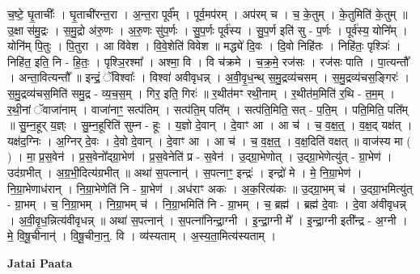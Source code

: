 \documentclass[17pt]{extarticle}
\begin{document}
च॒ष्टे॒ घृ॒ताचीः᳚ । घृ॒ताची॑रन्त॒रा । अ॒न्त॒रा पूर्व᳚म् । पूर्व॒मप॑रम् । अप॑रम् च । च॒ के॒तुम् । के॒तुमिति॑ के॒तुम् ॥ उ॒क्षा स॑मु॒द्रः । स॒मु॒द्रो अ॑रु॒णः । अ॒रु॒णः सु॑प॒र्णः । सु॒प॒र्णः पूर्व॑स्य । सु॒प॒र्ण इति॑ सु - प॒र्णः । पूर्व॑स्य॒ योनि᳚म् । योनि॑म् पि॒तुः । पि॒तुरा । आ वि॑वेश । वि॒वे॒शेति॑ विवेश ॥ मद्ध्ये॑ दि॒वः । दि॒वो निहि॑तः । निहि॑तः॒ पृश्ञिः॑ । निहि॑त॒ इति॒ नि - हि॒तः॒ । पृश्ञि॒रश्मा᳚ । अश्मा॒ वि । वि च॑क्रमे । च॒क्र॒मे॒ रज॑सः । रज॑सः पाति । पा॒त्यन्तौ᳚ । अन्ता॒वित्यन्तौ᳚ ॥ इन्द्रं॒ ॅविश्वाः᳚ । विश्वा॑ अवीवृधन्न् । अ॒वी॒वृ॒ध॒न्थ् स॒मु॒द्रव्य॑चसम् । स॒मु॒द्रव्य॑चस॒ङ्गिरः॑ । स॒मु॒द्रव्य॑चस॒मिति॑ समु॒द्र - व्य॒च॒स॒म् । गिर॒ इति॒ गिरः॑ ॥ र॒थीत॑मꣳ रथी॒नाम् । र॒थीत॑म॒मिति॑ र॒थि - त॒म॒म् । र॒थी॒नां ॅवाजा॑नाम् । वाजा॑नाꣳ॒॒ सत्प॑तिम् । सत्प॑ति॒म् पति᳚म् । सत्प॑ति॒मिति॒ सत् - प॒ति॒म् । पति॒मिति॒ पति᳚म् ॥ सु॒म्न॒हूर् य॒ज्ञ्ः । सु॒म्न॒हूरिति॑ सुम्न - हूः । य॒ज्ञो दे॒वान् । दे॒वाꣳ आ । आ च॑ । च॒ व॒क्ष॒त्॒ । व॒क्ष॒द् यक्ष॑त् । यक्ष॑द॒ग्निः । अ॒ग्निर् दे॒वः । दे॒वो दे॒वान् । दे॒वाꣳ आ । आ च॑ । च॒ व॒क्ष॒त्॒ । व॒क्ष॒दिति॑ वक्षत् ॥ वाज॑स्य मा ( ) । मा॒ प्र॒स॒वेन॑ । प्र॒स॒वेनो᳚द्ग्रा॒भेण॑ । प्र॒स॒वेनेति॑ प्र - स॒वेन॑ । उ॒द्ग्रा॒भेणोत् । उ॒द्ग्रा॒भेणेत्यु॑त् - ग्रा॒भेण॑ । उद॑ग्रभीत् । अ॒ग्र॒भी॒दित्य॑ग्रभीत् ॥ अथा॑ स॒पत्नान्॑ । स॒पत्नाꣳ॒॒ इन्द्रः॑ । इन्द्रो॑ मे । मे॒ नि॒ग्रा॒भेण॑ । नि॒ग्रा॒भेणाध॑रान् । नि॒ग्रा॒भेणेति॑ नि - ग्रा॒भेण॑ । अध॑राꣳ अकः । अ॒क॒रित्य॑कः ॥ उ॒द्ग्रा॒भम् च॑ । उ॒द्ग्रा॒भमित्यु॑त् - ग्रा॒भम् । च॒ नि॒ग्रा॒भम् । नि॒ग्रा॒भम् च॑ । नि॒ग्रा॒भमिति॑ नि - ग्रा॒भम् । च॒ ब्रह्म॑ । ब्रह्म॑ दे॒वाः । दे॒वा अ॑वीवृधन्न् । अ॒वी॒वृ॒ध॒न्नित्य॑वीवृधन्न् ॥ अथा॑ स॒पत्नान्॑ । स॒पत्ना॑निन्द्रा॒ग्नी । इ॒न्द्रा॒ग्नी मे᳚ । इ॒न्द्रा॒ग्नी इती᳚न्द्र - अ॒ग्नी । मे॒ वि॒षू॒चीनान्॑ । वि॒षू॒चीना॒न्॒. वि । व्य॑स्यताम् । अ॒स्य॒ता॒मित्य॑स्यताम् । \newline

\textbf{Jatai Paata} \newline
\end{document}
